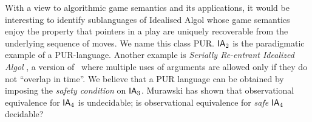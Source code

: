With a view to algorithmic game semantics and its applications, it
would be interesting to identify sublanguages of Idealised Algol whose
game semantics enjoy the property that pointers in a play are uniquely
recoverable from the underlying sequence of moves. We name this class
PUR. $\textsf{IA}_2$ is the paradigmatic example of a
PUR-language. Another example is \emph{Serially Re-entrant Idealized
  Algol} \cite{abramsky:mchecking_ia}, a version of \ialgol\ where
multiple uses of arguments are allowed only if they do not ``overlap
in time''.  We believe that a PUR language can be obtained by imposing
the \emph{safety condition} on $\textsf{IA}_3$. Murawski \cite{Murawski2003} has
shown that observational equivalence for $\textsf{IA}_4$ is
undecidable; is observational equivalence for \emph{safe} $\textsf{IA}_4$
decidable?
